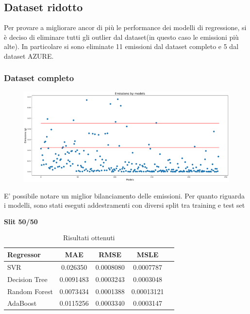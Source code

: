 \subsection{Dataset ridotto}

Per provare a migliorare ancor di più le performance dei modelli di regressione, si è deciso di eliminare tutti gli outlier dal dataset(in questo caso le emissioni più alte). In particolare si sono eliminate 11 emissioni dal dataset completo e 5 dal dataset AZURE.

\subsubsection{Dataset completo}

\begin{figure}[H]
    \centering
    \includegraphics[scale=1.25]{images/nuova-situazione-ridotto.png}
\end{figure}

E' possibile notare un miglior bilanciamento delle emissioni. Per quanto riguarda i modelli, sono stati eseguti addestramenti con diversi split tra training e test set

\textbf{Slit 50/50}


\begin{table}[H]
    \centering
    \begin{tabular}{|>{\centering\arraybackslash}m{5cm}|c|c|c|c|}
        \hline
        \textbf{Regressor} & \textbf{MAE} & \textbf{RMSE} & \textbf{MSLE} \\ [10pt]
        \hline
        SVR & 0.026350 & 0.0008080 & 0.0007787 \\ [10pt]
        \hline
        Decision Tree & 0.0091483 & 0.0003243 & 0.0003048 \\ [10pt]
        \hline
        Random Forest & 0.0073434 & 0.0001388 & 0.00013121 \\ [10pt]
        \hline
        AdaBoost & 0.0115256 & 0.0003340 & 0.0003147 \\ [10pt]
        \hline
    \end{tabular}
    \caption*{Risultati ottenuti}
    \label{tab:results}
\end{table}

